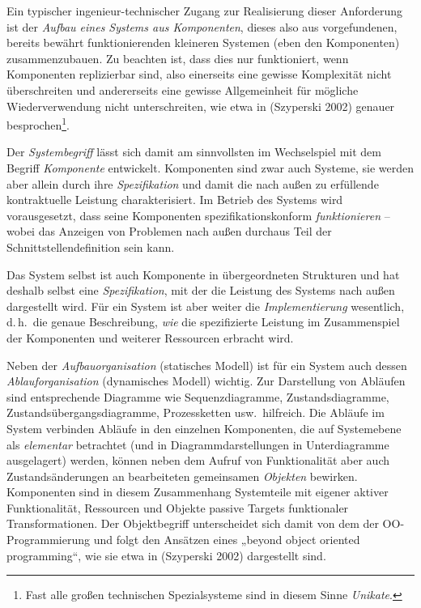 \documentclass[11pt,a4paper]{article}
\begin{document}
Ein typischer ingenieur-technischer Zugang zur Realisierung dieser Anforderung
ist der \emph{Aufbau eines Systems aus Komponenten}, dieses also aus
vorgefundenen, bereits bewährt funktionierenden kleineren Systemen (eben den
Komponenten) zusammenzubauen.  Zu beachten ist, dass dies nur funktioniert,
wenn Komponenten replizierbar sind, also einerseits eine gewisse Komplexität
nicht überschreiten und andererseits eine gewisse Allgemeinheit für mögliche
Wiederverwendung nicht unterschreiten, wie etwa in (Szyperski 2002) genauer
besprochen\footnote{Fast alle großen technischen Spezialsysteme sind in diesem
  Sinne \emph{Unikate}. }.

Der \emph{Systembegriff} lässt sich damit am sinnvollsten im Wechselspiel mit
dem Begriff \emph{Komponente} entwickelt.  Komponenten sind zwar auch Systeme,
sie werden aber allein durch ihre \emph{Spezifikation} und damit die nach
außen zu erfüllende kontraktuelle Leistung charakterisiert.  Im Betrieb des
Systems wird vorausgesetzt, dass seine Komponenten spezifikationskonform
\emph{funktionieren} -- wobei das Anzeigen von Problemen nach außen durchaus
Teil der Schnittstellendefinition sein kann.

Das System selbst ist auch Komponente in übergeordneten Strukturen und hat
deshalb selbst eine \emph{Spezifikation}, mit der die Leistung des Systems
nach außen dargestellt wird. Für ein System ist aber weiter die
\emph{Implementierung} wesentlich, d.\,h.\ die genaue Beschreibung, \emph{wie}
die spezifizierte Leistung im Zusammenspiel der Komponenten und weiterer
Ressourcen erbracht wird.

Neben der \emph{Aufbauorganisation} (statisches Modell) ist für ein System
auch dessen \emph{Ablauforganisation} (dynamisches Modell) wichtig. Zur
Darstellung von Abläufen sind entsprechende Diagramme wie Sequenzdiagramme,
Zustandsdiagramme, Zustandsübergangsdiagramme, Prozessketten
usw.\ hilfreich. Die Abläufe im System verbinden Abläufe in den einzelnen
Komponenten, die auf Systemebene als \emph{elementar} betrachtet (und in
Diagrammdarstellungen in Unterdiagramme ausgelagert) werden, können neben dem
Aufruf von Funktionalität aber auch Zustandsänderungen an bearbeiteten
gemeinsamen \emph{Objekten} bewirken.  Komponenten sind in diesem Zusammenhang
Systemteile mit eigener aktiver Funktionalität, Ressourcen und Objekte passive
Targets funktionaler Transformationen. Der Objektbegriff unterscheidet sich
damit von dem der OO-Programmierung und folgt den Ansätzen eines „beyond
object oriented programming“, wie sie etwa in (Szyperski 2002) dargestellt
sind.
\end{document}
